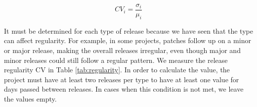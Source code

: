 \[ CV_i = \frac{\sigma_i}{\mu_i} \]

It must be determined for each type of release because we have seen that the type can affect regularity. For example, in some projects, patches follow up on a minor or major release, making the overall releases irregular, even though major and minor releases could still follow a regular pattern. We measure the release regularity CV in Table \ref{tab:regularity}. In order to calculate the value, the project must have at least two releases per type to have at least one value for days passed between releases. In cases when this condition is not met, we leave the values empty.

\begin{table}[!htbp]
    \centering
    \caption{Release regularities for major, minor and patch releases.}
    \label{tab:regularity}
\end{table}

